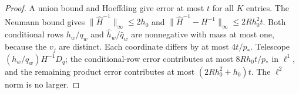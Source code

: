 \begin{proof}
A union bound and Hoeffding give error at most $t$ for all $K$ entries.
The Neumann bound gives $\|\widehat H^{-1}\|_\infty\le2h_0$ and
$\|\widehat H^{-1}-H^{-1}\|_\infty\le2Rh_0^2t$.
Both conditional rows $h_w/q_w$ and $\widehat h_w/\widehat q_w$ are
nonnegative with mass at most one, because the $v_j$ are distinct.
Each coordinate differs by at most $4t/p_*$. Telescope
$(h_w/q_w)H^{-1}D_q$; the conditional-row error contributes at most
$8Rh_0t/p_*$ in $\ell^1$, and the remaining product error contributes
at most $(2Rh_0^2+h_0)t$. The $\ell^2$ norm is no larger.
\end{proof}
